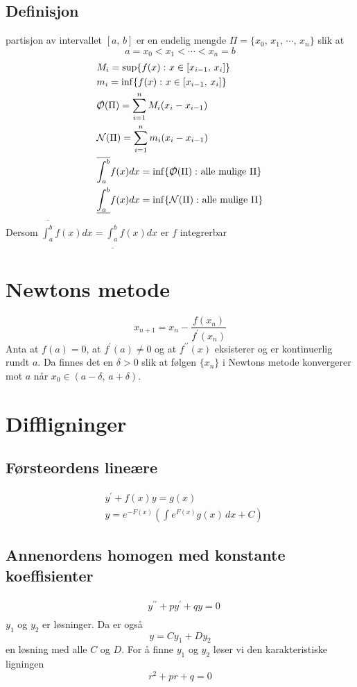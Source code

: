 \documentclass[defaultpackages]{cheatsheet}
\newcommand*{\Oe}{\slashed{\mathcal O}}
\begin{document}
	\subsection{Definisjon}
	partisjon av intervallet $[a,\,b]$ er en endelig mengde $\Pi = \{x_0,\,x_1,\,\cdots,\,x_n\}$ slik at 
	\[a = x_0<x_1<\cdots<x_n=b\]
	\begin{align*}
		&M_i = \sup\{f(x) \,\colon x\in [x_{i-1},\,x_i]\}\\
		&m_i = \inf\{f(x) \,\colon x\in [x_{i-1},\,x_i]\}\\
		&\Oe(\Pi) = \sum_{i=1}^{n} M_i(x_i-x_{i-1})\\
		&\mathcal{N}(\Pi) = \sum_{i=1}^n m_i(x_i-x_{i-1})\\
		&\overline{\int_a^b} f(x) dx = \inf\{\Oe(\Pi)\,\colon\text{alle mulige } \Pi\}\\
		&\underline{\int_a^b} f(x) dx = \inf\{\mathcal{N}(\Pi)\,\colon\text{alle mulige } \Pi\}
	\end{align*}
	Dersom $\overline{\int_a^b} f(x) dx = \underline{\int_a^b} f(x) dx$ er $f$ integrerbar
\section{Newtons metode}
	\phantom{}
	\[x_{n+1} = x_n - \frac{f(x_n)}{f^\prime(x_n)}\]
	Anta at $f(a)=0$, at $f^\prime(a)\neq 0$ og at $f^{\prime\prime}(x)$ eksisterer og er kontinuerlig rundt $a$. Da finnes det en $\delta > 0$ slik at følgen $\{x_n\}$ i Newtons metode konvergerer mot $a$ når $x_0\in (a-\delta,\,a+\delta)$. 
	\section{Diffligninger}
	\subsection{Førsteordens lineære}
	\begin{align*}
		&y^\prime + f(x)y = g(x)\\
		&y = e^{-F(x)}\left(\int e^{F(x)}g(x)\,dx + C\right)
	\end{align*}
\subsection{Annenordens homogen med konstante koeffisienter}
\begin{align*}
	&y^{\prime\prime}+py^\prime+qy=0\\
\end{align*}
	$y_1$ og $y_2$ er løsninger. Da er også
	$$y = Cy_1 + Dy_2$$
	en løsning med alle $C$ og $D$.
	For å finne $y_1$ og $y_2$ løser vi den karakteristiske ligningen
	\[r^2+pr + q = 0\]
\end{document}

